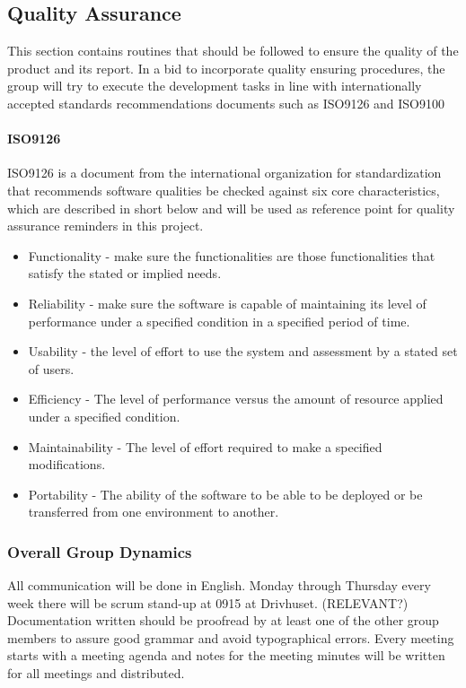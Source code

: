 \subsection{Quality Assurance}

This section contains routines that should be followed to ensure the
quality of the product and its report. In a bid to incorporate quality ensuring procedures, the group will try to execute the development tasks in line with internationally accepted standards recommendations documents such as ISO9126 and ISO9100

\paragraph{ISO9126}
ISO9126 is a document from the international organization for standardization that recommends software qualities be checked against six core characteristics, which are described in short below and will be used as reference point for quality assurance reminders in this project\cite{iso:9126}.

\begin{itemize}
		\item Functionality - make sure the functionalities are those functionalities that satisfy the stated or implied needs.
		\item Reliability - make sure the software is capable of maintaining its level of performance under a specified condition in a specified period of time.
		\item Usability - the level of effort to use the system and assessment by a stated set of users.
		\item Efficiency - The level of performance versus the amount of resource applied under a specified condition.
        \item Maintainability - The level of effort required to make a specified modifications.
        \item Portability - The ability of the software to be able to be deployed or be transferred from one environment to another.
\end{itemize}


\subsubsection{Overall Group Dynamics}

All communication will be done in English.
Monday through Thursday every week there will be scrum stand-up at 0915 at Drivhuset. (RELEVANT?)
Documentation written should be proofread by at least one of the other group members
to assure good grammar and avoid typographical errors.
Every meeting starts with a meeting agenda and notes for the meeting minutes will be
written for all meetings and distributed.

